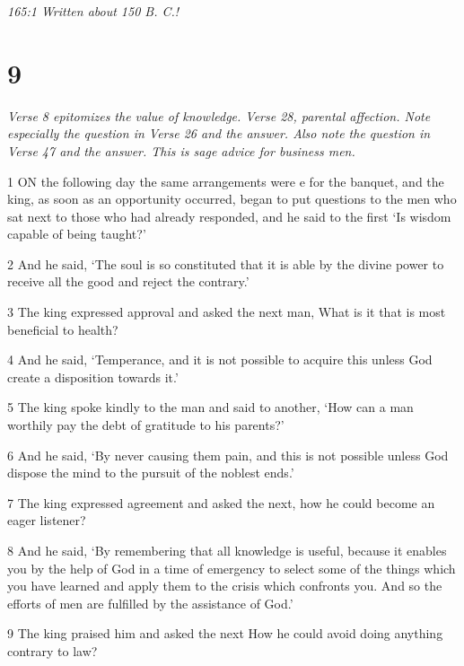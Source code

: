 \par \textit{165:1 Written about 150 B. C.!}

\chapter{9}

\par \textit{Verse 8 epitomizes the value of knowledge. Verse 28, parental affection. Note especially the question in Verse 26 and the answer. Also note the question in Verse 47 and the answer. This is sage advice for business men.}

\par 1 ON the following day the same arrangements were e for the banquet, and the king, as soon as an opportunity occurred, began to put questions to the men who sat next to those who had already responded, and he said to the first ‘Is wisdom capable of being taught?’

\par 2 And he said, ‘The soul is so constituted that it is able by the divine power to receive all the good and reject the contrary.’

\par 3 The king expressed approval and asked the next man, What is it that is most beneficial to health?

\par 4 And he said, ‘Temperance, and it is not possible to acquire this unless God create a disposition towards it.’

\par 5 The king spoke kindly to the man and said to another, ‘How can a man worthily pay the debt of gratitude to his parents?’

\par 6 And he said, ‘By never causing them pain, and this is not possible unless God dispose the mind to the pursuit of the noblest ends.’

\par 7 The king expressed agreement and asked the next, how he could become an eager listener?

\par 8 And he said, ‘By remembering that all knowledge is useful, because it enables you by the help of God in a time of emergency to select some of the things which you have learned and apply them to the crisis which confronts you. And so the efforts of men are fulfilled by the assistance of God.’

\par 9 The king praised him and asked the next How he could avoid doing anything contrary to law?

